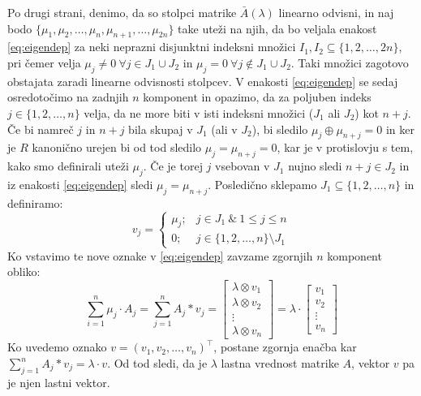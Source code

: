 \documentclass[mat1]{fmfdelo}
\begin{document}
\begin{dokaz}
	Po drugi strani, denimo, da so stolpci matrike $\bar{A}(\lambda)$ linearno odvisni, in naj bodo $\{\mu_1, \mu_2, \ldots, \mu_n, \mu_{n+1}, \ldots, \mu_{2n}\}$ take uteži na njih, da bo veljala enakost \ref{eq:eigendep} za neki neprazni disjunktni indeksni množici $I_1, I_2 \subseteq \{1, 2, \ldots, 2n\}$, pri čemer velja $\mu_j \neq 0~\forall j\in J_1\cup J_2$ in $\mu_j = 0~\forall j \notin J_1\cup J_2$. Taki množici zagotovo obstajata zaradi linearne odvisnosti stolpcev. V enakosti \ref{eq:eigendep} se sedaj osredotočimo na zadnjih $n$ komponent in opazimo, da za poljuben indeks $j \in \{1, 2, \ldots, n\}$ velja, da ne more biti v isti indeksni množici ($J_1$ ali $J_2$) kot $n+j$. Če bi namreč $j$ in $n+j$ bila skupaj v $J_1$ (ali v $J_2$), bi sledilo $\mu_j \oplus \mu_{n+j} = 0$ in ker je $R$ kanonično urejen bi od tod sledilo $\mu_j = \mu_{n+j} = 0$, kar je v protislovju s tem, kako smo definirali uteži $\mu_j$. Če je torej $j$ vsebovan v $J_1$ nujno sledi $n+j \in J_2$ in iz enakosti \ref{eq:eigendep} sledi $\mu_j = \mu_{n+j}$. Posledično sklepamo $J_1 \subseteq \{1, 2, \ldots, n\}$ in definiramo: $$v_j = \begin{cases}
		\mu_j;& j\in J_1~\&~1\leq j \leq n \\ 
		0;& j\in \{1, 2, \ldots, n\}\setminus J_1
	\end{cases}$$
Ko vstavimo te nove oznake v \ref{eq:eigendep} zavzame zgornjih $n$ komponent obliko: $$\sum_{i = 1}^{n}\mu_j\cdot A_j = \sum_{j = 1}^{n} A_j * v_j = \begin{bmatrix}
	\lambda \otimes v_1 \\
	\lambda \otimes v_2 \\
	\vdots \\
	\lambda \otimes v_n
\end{bmatrix} = \lambda \cdot \begin{bmatrix}
v_1 \\
v_2 \\
\vdots \\
v_n
\end{bmatrix}$$
Ko uvedemo oznako $v = (v_1, v_2, \ldots, v_n)^\top$, postane zgornja enačba kar $\sum_{j = 1}^{n} A_j * v_j = \lambda\cdot v$. Od tod sledi, da je $\lambda$ lastna vrednost matrike $A$, vektor $v$ pa je njen lastni vektor.
\end{dokaz}
	
\end{document}
